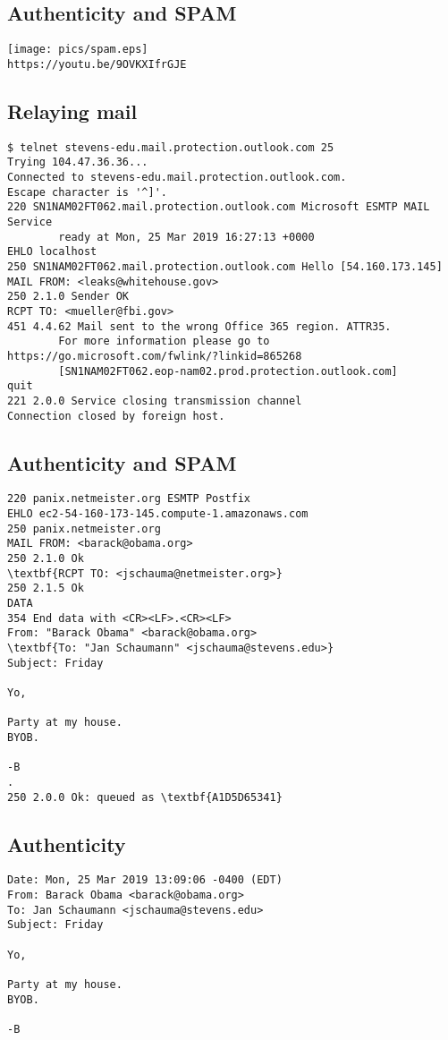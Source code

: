 \documentclass[xga]{xdvislides}
\begin{document}
\subsection{Authenticity and SPAM}
\vspace*{\fill}
\begin{center}
	\texttt{[image: pics/spam.eps]} \\
	{\tt https://youtu.be/9OVKXIfrGJE}
\end{center}
\vspace*{\fill}

\subsection{Relaying mail}
\begin{verbatim}
$ telnet stevens-edu.mail.protection.outlook.com 25
Trying 104.47.36.36...
Connected to stevens-edu.mail.protection.outlook.com.
Escape character is '^]'.
220 SN1NAM02FT062.mail.protection.outlook.com Microsoft ESMTP MAIL Service
        ready at Mon, 25 Mar 2019 16:27:13 +0000
EHLO localhost
250 SN1NAM02FT062.mail.protection.outlook.com Hello [54.160.173.145]
MAIL FROM: <leaks@whitehouse.gov>
250 2.1.0 Sender OK
RCPT TO: <mueller@fbi.gov>
451 4.4.62 Mail sent to the wrong Office 365 region. ATTR35.
        For more information please go to https://go.microsoft.com/fwlink/?linkid=865268
        [SN1NAM02FT062.eop-nam02.prod.protection.outlook.com]
quit
221 2.0.0 Service closing transmission channel
Connection closed by foreign host.
\end{verbatim}

\subsection{Authenticity and SPAM}
\smallish
\begin{Verbatim}
220 panix.netmeister.org ESMTP Postfix
EHLO ec2-54-160-173-145.compute-1.amazonaws.com
250 panix.netmeister.org
MAIL FROM: <barack@obama.org>
250 2.1.0 Ok
\textbf{RCPT TO: <jschauma@netmeister.org>}
250 2.1.5 Ok
DATA
354 End data with <CR><LF>.<CR><LF>
From: "Barack Obama" <barack@obama.org>
\textbf{To: "Jan Schaumann" <jschauma@stevens.edu>}
Subject: Friday

Yo,

Party at my house.
BYOB.

-B
.
250 2.0.0 Ok: queued as \textbf{A1D5D65341}
\end{Verbatim}
\Normalsize

\subsection{Authenticity}
\begin{verbatim}
Date: Mon, 25 Mar 2019 13:09:06 -0400 (EDT)                                                         
From: Barack Obama <barack@obama.org>
To: Jan Schaumann <jschauma@stevens.edu>
Subject: Friday

Yo,

Party at my house.
BYOB.

-B
\end{verbatim}
\end{document}

